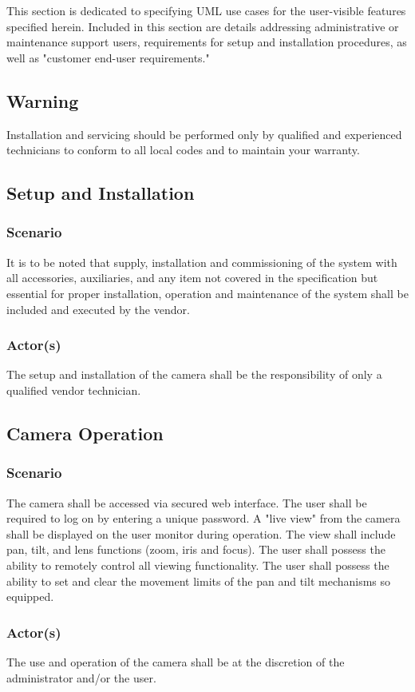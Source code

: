This section is dedicated to specifying UML use cases for the user-visible features specified herein. Included in this section are details addressing administrative or maintenance support users, requirements for setup and installation procedures, as well as "customer end-user requirements."

\subsection{Warning}
Installation and servicing should be performed only by qualified and experienced technicians to conform to all local codes and to maintain your warranty.
\subsection{Setup and Installation}
\subsubsection{Scenario}
It is to be noted that supply, installation and commissioning of the system with all accessories, auxiliaries, and any item not covered in the specification but essential for proper installation, operation and maintenance of the system shall be included and executed by the vendor.
\subsubsection{Actor(s)}
The setup and installation of the camera shall be the responsibility of only a qualified vendor technician.
\subsection{Camera Operation}
\subsubsection{Scenario}
The camera shall be accessed via secured web interface.
The user shall be required to log on by entering a unique password.
A "live view" from the camera shall be displayed on the user monitor during operation. 
The view shall include pan, tilt, and lens functions (zoom, iris and focus). 
The user shall possess the ability to remotely control all viewing functionality.
The user shall possess the ability to set and clear the movement limits of the pan and tilt mechanisms so equipped.
\subsubsection{Actor(s)}
The use and operation of the camera shall be at the discretion of the administrator and/or the user.
